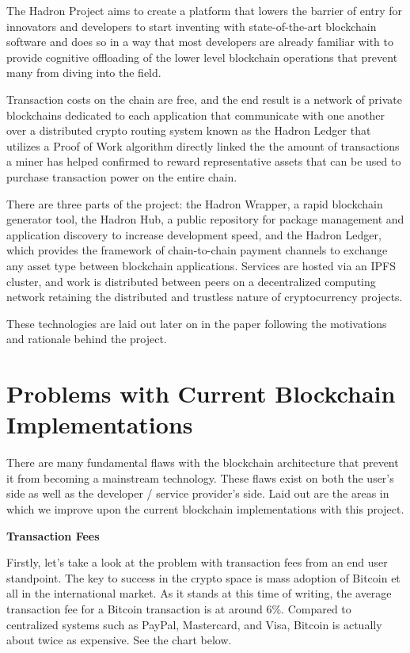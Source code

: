 \documentclass{article}
\begin{document}
The Hadron Project aims to create a platform that lowers the barrier of entry for innovators and developers to start inventing with state-of-the-art blockchain software and does so in a way that most developers are already familiar with to provide cognitive offloading of the lower level blockchain operations that prevent many from diving into the field.

Transaction costs on the chain are free, and the end result is a network of private blockchains dedicated to each application that communicate with one another over a distributed crypto routing system known as the Hadron Ledger that utilizes a Proof of Work algorithm directly linked the the amount of transactions a miner has helped confirmed to reward representative assets that can be used to purchase transaction power on the entire chain.

There are three parts of the project: the Hadron Wrapper, a rapid blockchain generator tool, the Hadron Hub, a public repository for package management and application discovery to increase development speed, and the Hadron Ledger, which provides the framework of chain-to-chain payment channels to exchange any asset type between blockchain applications. Services are hosted via an IPFS cluster, and work is distributed between peers on a decentralized computing network retaining the distributed and trustless nature of cryptocurrency projects.

These technologies are laid out later on in the paper following the motivations and rationale behind the project.

\section{Problems with Current Blockchain Implementations}

There are many fundamental flaws with the blockchain architecture that prevent it from becoming a mainstream technology. These flaws exist on both the user’s side as well as the developer / service provider’s side. Laid out are the areas in which we improve upon the current blockchain implementations with this project.

\begin{center}
\textbf{Transaction Fees}
\end{center}

Firstly, let’s take a look at the problem with transaction fees from an end user standpoint. The key to success in the crypto space is mass adoption of Bitcoin et all in the international market. As it stands at this time of writing, the average transaction fee for a Bitcoin transaction is at around 6\%. Compared to centralized systems such as PayPal, Mastercard, and Visa, Bitcoin is actually about twice as expensive. See the chart below.
\end{document}
